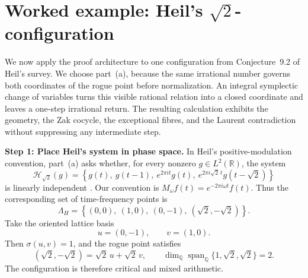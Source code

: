 \documentclass[reqno]{amsart}
\theoremstyle{remark}
\numberwithin{equation}{section}
\newcommand{\R}{\mathbb{R}}
\newcommand{\Q}{\mathbb{Q}}
\begin{document}
\section{Worked example: Heil's
\texorpdfstring{\(\sqrt2\)}{sqrt(2)}-configuration}
\label{sec:heil-worked}

We now apply the proof architecture to one configuration from
Conjecture~9.2 of Heil's survey. We choose part~(a), because the same
irrational number governs both coordinates of the rogue point before
normalization. An integral symplectic change of variables turns this visible
rational relation into a closed coordinate and leaves a one-step irrational
return. The resulting calculation exhibits the geometry, the Zak cocycle,
the exceptional fibres, and the Laurent contradiction without suppressing
any intermediate step.

\smallskip
\noindent
\textbf{Step 1: Place Heil's system in phase space.}
In Heil's positive-modulation convention, part~(a) asks whether, for every
nonzero \(g\in L^2(\R)\), the system
\begin{equation}
  \mathcal H_{\sqrt2}(g)
  =\left\{
    g(t),\ g(t-1),\ e^{2\pi it}g(t),\
    e^{2\pi i\sqrt2\,t}g(t-\sqrt2)
  \right\}
  \label{eq:heil-system}
\end{equation}
is linearly independent
\cite[Conjecture~9.2(a), p.~173]{HeilSurvey}. Our convention is
\(M_\omega f(t)=e^{-2\pi i\omega t}f(t)\). Thus the corresponding set of
time-frequency points is
\begin{equation}
  \Lambda_H
  =\left\{
    (0,0),\ (1,0),\ (0,-1),\ (\sqrt2,-\sqrt2)
  \right\}.
  \label{eq:heil-points}
\end{equation}
Take the oriented lattice basis
\[
  u=(0,-1),\qquad v=(1,0).
\]
Then \(\sigma(u,v)=1\), and the rogue point satisfies
\[
  (\sqrt2,-\sqrt2)=\sqrt2\,u+\sqrt2\,v,
  \qquad
  \dim_{\Q}\operatorname{span}_{\Q}\{1,\sqrt2,\sqrt2\}=2.
\]
The configuration is therefore critical and mixed arithmetic.
\end{document}
